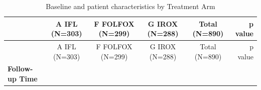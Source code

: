 \documentclass[
]{book}
\begin{document}
\begin{longtable}[]{@{}lccccr@{}}
\caption{Baseline and patient characteristics by Treatment Arm}\tabularnewline
\toprule
\begin{minipage}[b]{0.21\columnwidth}\raggedright
\strut
\end{minipage} & \begin{minipage}[b]{0.14\columnwidth}\centering
A IFL (N=303)\strut
\end{minipage} & \begin{minipage}[b]{0.14\columnwidth}\centering
F FOLFOX (N=299)\strut
\end{minipage} & \begin{minipage}[b]{0.14\columnwidth}\centering
G IROX (N=288)\strut
\end{minipage} & \begin{minipage}[b]{0.14\columnwidth}\centering
Total (N=890)\strut
\end{minipage} & \begin{minipage}[b]{0.06\columnwidth}\raggedleft
p value\strut
\end{minipage}\tabularnewline
\midrule
\endfirsthead
\toprule
\begin{minipage}[b]{0.21\columnwidth}\raggedright
\strut
\end{minipage} & \begin{minipage}[b]{0.14\columnwidth}\centering
A IFL (N=303)\strut
\end{minipage} & \begin{minipage}[b]{0.14\columnwidth}\centering
F FOLFOX (N=299)\strut
\end{minipage} & \begin{minipage}[b]{0.14\columnwidth}\centering
G IROX (N=288)\strut
\end{minipage} & \begin{minipage}[b]{0.14\columnwidth}\centering
Total (N=890)\strut
\end{minipage} & \begin{minipage}[b]{0.06\columnwidth}\raggedleft
p value\strut
\end{minipage}\tabularnewline
\midrule
\endhead
\begin{minipage}[t]{0.21\columnwidth}\raggedright
\textbf{Follow-up Time}\strut
\end{minipage} & \begin{minipage}[t]{0.14\columnwidth}\centering
\strut
\end{minipage} & \begin{minipage}[t]{0.14\columnwidth}\centering

\end{minipage}
\end{longtable}
\end{document}
